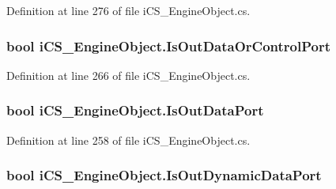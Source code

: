 Definition at line 276 of file i\+C\+S\+\_\+\+Engine\+Object.\+cs.

\hypertarget{classi_c_s___engine_object_af1e6931562955cf83d6cb2796bd84f26}{
\subsubsection[{Is\+Out\+Data\+Or\+Control\+Port}]{\setlength{\rightskip}{0pt plus 5cm}bool i\+C\+S\+\_\+\+Engine\+Object.\+Is\+Out\+Data\+Or\+Control\+Port\hspace{0.3cm}{\ttfamily [get]}}}\label{classi_c_s___engine_object_af1e6931562955cf83d6cb2796bd84f26}


Definition at line 266 of file i\+C\+S\+\_\+\+Engine\+Object.\+cs.

\hypertarget{classi_c_s___engine_object_aee4ceccbddea83cf1320c0a91eea4ca4}{
\subsubsection[{Is\+Out\+Data\+Port}]{\setlength{\rightskip}{0pt plus 5cm}bool i\+C\+S\+\_\+\+Engine\+Object.\+Is\+Out\+Data\+Port\hspace{0.3cm}{\ttfamily [get]}}}\label{classi_c_s___engine_object_aee4ceccbddea83cf1320c0a91eea4ca4}


Definition at line 258 of file i\+C\+S\+\_\+\+Engine\+Object.\+cs.

\hypertarget{classi_c_s___engine_object_ac7e4a58e77f73c6789701d2928f85faa}{
\subsubsection[{Is\+Out\+Dynamic\+Data\+Port}]{\setlength{\rightskip}{0pt plus 5cm}bool i\+C\+S\+\_\+\+Engine\+Object.\+Is\+Out\+Dynamic\+Data\+Port\hspace{0.3cm}{\ttfamily [get]}}}\label{classi_c_s___engine_object_ac7e4a58e77f73c6789701d2928f85faa}


